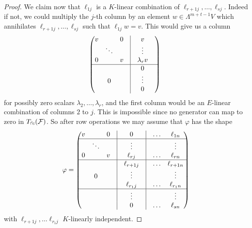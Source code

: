 \documentclass[twoside,12pt, leqno]{article}
\begin{document}
\begin{proof}
We claim now that $\ell_{1j}$ is a $K$-linear combination of $\ell_{r+1j}, \ldots, \ell_{sj}$. Indeed if not, we could multiply
the $j$-th column by an element $w \in \Lambda^{m+t-1} V$ which annihilates $\ell_{r+1j}, \ldots, \ell_{sj}$ such that $\ell_{1j}w =v$.
This would give us a column
$$
\begin{pmatrix}
v &         & 0 &\vrule &v  \cr
   &\ddots &  &\vrule& \vdots    \cr
0 & & v & \vrule& \lambda_r v &   \cr \hline
  & &  &  \vrule&0   \cr
 &0 & &   \vrule&\vdots    \cr
  & &  &  \vrule&0   \cr
\end{pmatrix}\
$$
for possibly zero scalars $\lambda_2, \ldots, \lambda_r$, and the first column would be an $E$-linear combination of columns $2$ to $j$.
This is impossible since no generator can map to zero in $T_{\Rsh \kern -1pt c}({\mathcal F})$.
So after row operations we may assume that $\varphi$ has the shape
$$
\varphi=\begin{pmatrix}
v &         & 0 &\vrule &0 &\vrule&\ldots & \ell_{1n}   \cr \hline
   &\ddots &  &\vrule& \vdots&\vrule   & & \vdots \cr
0 & & v & \vrule& \ell_{rj} &\vrule& \ldots & \ell_{rn}   \cr \hline
  & &  &  \vrule&\ell_{r+1j} &\vrule& \ldots & \ell_{r+1n}   \cr
 &0 & &   \vrule&\vdots &\vrule  & & \vdots \cr
   & &  &  \vrule&\ell_{r_1j} &\vrule& \ldots & \ell_{r_1n}   \cr \hline
      & & &   \vrule&\vdots &\vrule & & \vdots \cr
  & &  &  \vrule&0 &\vrule& \ldots & \ell_{sn}   \cr
\end{pmatrix}
$$
with $\ell_{r+1j},\ldots \ell_{r_1j}$ $K$-linearly independent. 


\end{proof}
\end{document}
